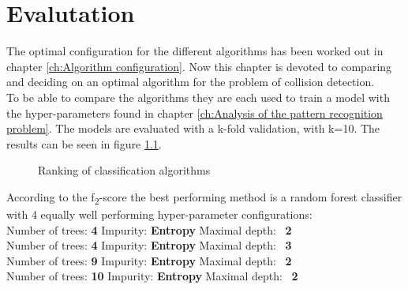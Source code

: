 \chapter{Evalutation}
\label{ch:Evalutation}
The optimal configuration for the different algorithms has been worked out in chapter \ref{ch:Algorithm configuration}. Now this chapter is devoted to comparing and deciding on an optimal algorithm for the problem of collision detection.\\
To be able to compare the algorithms they are each used to train a model with the hyper-parameters found in chapter \ref{ch:Analysis of the pattern recognition problem}. The models are evaluated with a k-fold validation, with k=10. The results can be seen in figure \ref{fig:ranking}.


\begin{figure}[h]
\centering
{}

\caption{Ranking of classification algorithms}
\label{fig:ranking}
\end{figure}

According to the  f\textsubscript{2}-score the best performing method is a random forest classifier with 4 equally well performing hyper-parameter configurations:\\

Number of trees: \textbf{4}  \qquad 
Impurity:  \textbf{Entropy}  \qquad 
Maximal depth: \ \textbf{2}  \qquad 
\\
Number of trees: \textbf{4}  \qquad 
Impurity:  \textbf{Entropy}  \qquad 
Maximal depth: \ \textbf{3}  \qquad
\\
Number of trees: \textbf{9}  \qquad 
Impurity:  \textbf{Entropy}  \qquad 
Maximal depth: \ \textbf{2}  \qquad
\\
Number of trees: \textbf{10}  \qquad 
Impurity:  \textbf{Entropy}  \qquad 
Maximal depth: \ \textbf{2}  \qquad
\\ 



